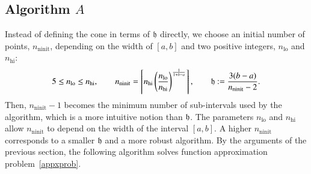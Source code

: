 \documentclass[review]{elsarticle}
\theoremstyle{definition}
\DeclareMathOperator{\lo}{lo}
\DeclareMathOperator{\ninit}{ninit}
\begin{document}
\subsection{Algorithm $A$} \label{subsec:appxalgo}
Instead of defining the cone in terms of $\mathfrak{h}$ directly, we choose an initial number of points, $n_{\ninit}$, depending on the width of $[a,b]$ and two positive integers, $n_{\lo}$ and $n_{\text{hi}}$:
\begin{equation}
\label{nodefinition}
5 \le n_{\lo} \le n_{\text{hi}}, \qquad n_{\ninit} = \left\lceil n_{\text{hi}}
\left(\frac{n_{\lo}}{n_{\text{hi}}}\right)^{\frac{1}{1+b-a}}\right\rceil,  \qquad \fh := \frac{3(b-a)}{n_{\ninit}-2}.
\end{equation}
Then, $n_{\ninit} -1$ becomes the minimum number of sub-intervals used by the algorithm, which is a more intuitive notion than $\mathfrak{h}$.  The parameters $n_{\lo}$ and $n_{\text{hi}}$ allow $n_{\ninit}$ to depend on the width of the interval $[a,b]$.  A higher $n_{\ninit}$ corresponds to a smaller $\mathfrak{h}$ and a more robust algorithm.  By the arguments of the previous section, the following algorithm solves function approximation problem~\eqref{appxprob}.
\end{document}
